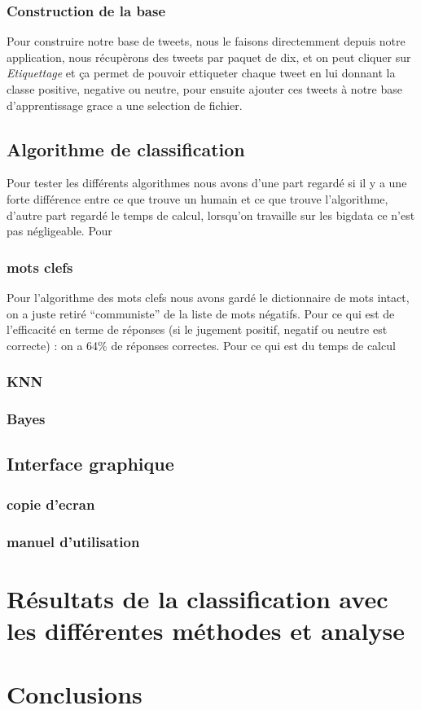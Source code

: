 \documentclass[a4paper,10pt]{report}
\begin{document}
    \subsection{Construction de la base}
      Pour construire notre base de tweets, nous le faisons directemment depuis notre application, nous récupèrons des tweets par 
      paquet de dix, et on peut cliquer sur \emph{Etiquettage} et ça permet de pouvoir ettiqueter chaque tweet en lui donnant la classe positive, negative ou neutre,
      pour ensuite ajouter ces tweets à notre base d'apprentissage grace a une selection de fichier.
  \section{Algorithme de classification}
    Pour tester les différents algorithmes nous avons d'une part regardé si il y a une forte différence entre ce que trouve un humain et ce que trouve l'algorithme, d'autre part
    regardé le temps de calcul, lorsqu'on travaille sur les bigdata ce n'est pas négligeable.
    Pour 
    \subsection{mots clefs}
      Pour l'algorithme des mots clefs nous avons gardé le dictionnaire de mots intact, on a juste retiré ``communiste'' de la liste de mots négatifs.
      Pour ce qui est de l'efficacité en terme de réponses (si le jugement positif, negatif ou neutre est correcte) : on a 64\% de réponses correctes.
      Pour ce qui est du temps de calcul %
      
      
    \subsection{KNN}
      
    \subsection{Bayes}
  \section{Interface graphique}
    \subsection{copie d'ecran}
    \subsection{manuel d'utilisation}
\chapter{Résultats de la classification avec les différentes méthodes et analyse}
\chapter{Conclusions}
\end{document}
